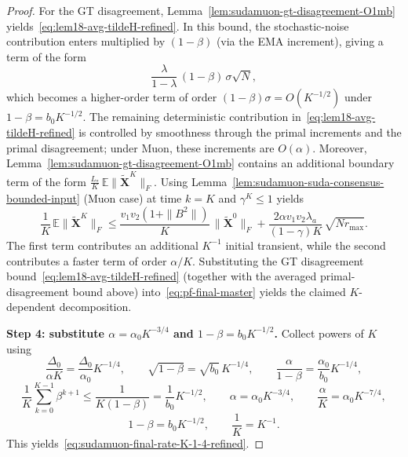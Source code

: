 \documentclass{article}
\begin{document}
\begin{proof}
For the GT disagreement, Lemma~\ref{lem:sudamuon-gt-disagreement-O1mb} yields~\eqref{eq:lem18-avg-tildeH-refined}.
In this bound, the stochastic-noise contribution enters multiplied by $(1-\beta)$ (via the EMA increment), giving a term of the form
\[
\frac{\lambda}{1-\lambda}\,(1-\beta)\,\sigma\sqrt N,
\]
which becomes a higher-order term of order $(1-\beta)\sigma=O(K^{-1/2})$ under $1-\beta=b_0K^{-1/2}$.
The remaining deterministic contribution in~\eqref{eq:lem18-avg-tildeH-refined} is controlled by smoothness through the primal increments and the primal disagreement; under Muon, these increments are $O(\alpha)$.
Moreover, Lemma~\ref{lem:sudamuon-gt-disagreement-O1mb} contains an additional boundary term of the form $\tfrac{L_*}{K}\,\mathbb{E}\|\tilde{\mathbf X}^K\|_F$.
Using Lemma~\ref{lem:sudamuon-suda-consensus-bounded-input} (Muon case) at time $k=K$ and $\gamma^K\le 1$ yields
\[
\frac{1}{K}\,\mathbb{E}\|\tilde{\mathbf X}^K\|_F
\le \frac{v_1v_2(1+\|B^2\|)}{K}\,\|\tilde{\mathbf X}^0\|_F+\frac{2\alpha v_1v_2\lambda_a}{(1-\gamma)K}\,\sqrt{Nr_{\max}}.
\]
The first term contributes an additional $K^{-1}$ initial transient, while the second contributes a faster term of order $\alpha/K$.
Substituting the GT disagreement bound~\eqref{eq:lem18-avg-tildeH-refined} (together with the averaged primal-disagreement bound above) into~\eqref{eq:pf-final-master} yields the claimed $K$-dependent decomposition.

\medskip\noindent\textbf{Step 4: substitute $\alpha=\alpha_0K^{-3/4}$ and $1-\beta=b_0K^{-1/2}$.}
Collect powers of $K$ using
\[
\frac{\Delta_0}{\alpha K}=\frac{\Delta_0}{\alpha_0}K^{-1/4},\qquad
\sqrt{1-\beta}=\sqrt{b_0}\,K^{-1/4},\qquad
\frac{\alpha}{1-\beta}=\frac{\alpha_0}{b_0}K^{-1/4},
\]
\[
\frac{1}{K}\sum_{k=0}^{K-1}\beta^{k+1}\le \frac{1}{K(1-\beta)}=\frac{1}{b_0}K^{-1/2},\qquad
\alpha=\alpha_0K^{-3/4},\qquad
\frac{\alpha}{K}=\alpha_0K^{-7/4},
\]
\[
1-\beta=b_0K^{-1/2},\qquad
\frac{1}{K}=K^{-1}.
\]
This yields~\eqref{eq:sudamuon-final-rate-K-1-4-refined}.
\end{proof}
\end{document}
